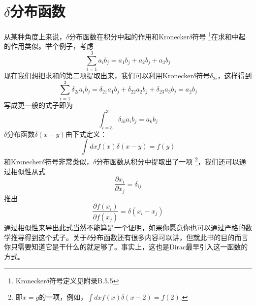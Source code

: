 \section{$\delta$分布函数}
从某种角度上来说，$\delta$分布函数在积分中起的作用和Kronecker$\delta$符号
\footnote{Kronecker$\delta$符号定义见附录B.5.5}在求和中起的作用类似。举个例子，考虑
\begin{equation}
  \sum_{i=1}^3 a_i b_j=a_1 b_j+a_2 b_j+a_3 b_j
\end{equation}
现在我们想把求和的第二项提取出来，我们可以利用Kronecker$\delta$符号$\delta_{2i}$，这样得到
\begin{equation}
  \sum_{i=1}^3 \delta_{2i} a_i b_j=\delta_{21} a_1 b_j+\delta_{22} a_2 b_j+\delta_{23} a_3 b_j=a_2 b_j
\end{equation}
写成更一般的式子即为
\begin{equation}
  \int^3_{i=3} \delta_{ik} a_i b_j=a_k b_j
\end{equation}
$\delta$分布函数$\delta(x-y)$由下式定义：
\begin{equation}
    \int dx f(x)\delta(x-y)=f(y)
\end{equation}
和Kronecher$\delta$符号非常类似，$\delta$分布函数从积分中提取出了一项
\footnote{即$x=y$的一项，例如，$\int dx f(x)\delta(x-2)=f(2)$.}，我们还可以通过相似性从式
\begin{equation}
  \frac{\partial x_i}{\partial x_j}=\delta_{ij}
\end{equation}
推出
\begin{equation}
    \frac{\partial f(x_i)}{\partial f(x_j)}=\delta(x_i-x_j)
\end{equation}
通过相似性来导出此式当然不能算是一个证明，如果你愿意你也可以通过严格的数学推导得到这个式子。关于$\delta$分布函数还有很多内容可以讲，但就此书的目的而言你只需要知道它是干什么的就足够了。事实上，这也是Dirac最早引入这一函数的方式。
